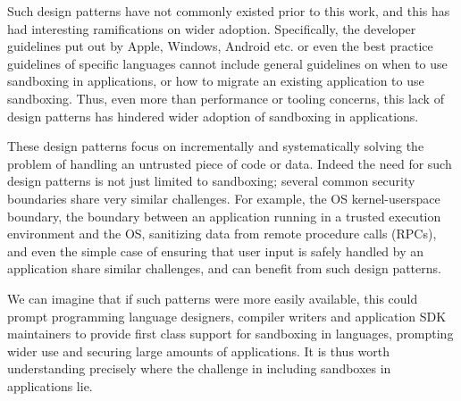 Such design patterns have not commonly existed prior to this work, and this has 
had interesting ramifications on wider adoption.
%
Specifically, the developer guidelines put out by Apple, Windows, Android etc. 
or even the best practice guidelines of specific languages cannot include 
general guidelines on when to use sandboxing in applications, or how to migrate 
an existing application to use sandboxing.
%
Thus, even more than performance or tooling concerns, this lack of design 
patterns has hindered wider adoption of sandboxing in applications.

These design patterns focus on incrementally and systematically solving the 
problem of handling an untrusted piece of code or data.
%
Indeed the need for such design patterns is not just limited to sandboxing; 
several common security boundaries share very similar challenges. 
%
For example, the OS kernel-userspace boundary, the boundary between an 
application running in a trusted execution environment and the OS, sanitizing 
data from remote procedure calls (RPCs), and even the simple case of ensuring 
that user input is safely handled by an application share similar challenges, 
and can benefit from such design patterns.

We can imagine that if such patterns were more easily available, this could 
prompt programming language designers, compiler writers and application SDK 
maintainers to provide first class support for sandboxing in languages, 
prompting wider use and securing large amounts of applications.
%
It is thus worth understanding precisely where the challenge in including 
sandboxes in applications lie.